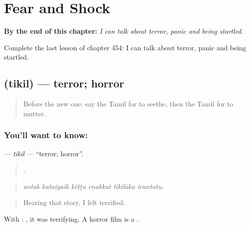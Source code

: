 
\chapter{Fear and Shock}
\label{ch:ta-fear-and-shock}

\begin{chapteropening}
\textbf{By the end of this chapter:} \emph{I can talk about terror, panic and being startled.}

Complete the last lesson of chapter 454: I can talk about terror, panic and being startled.
\end{chapteropening}

\section[\texorpdfstring{\ta{திகில்} (tikil)}{திகில் (tikil)}]{ (tikil) — terror; horror}

\label{lesson:TA-C454-tikil}



\begin{quote}
Before the new one: say the Tamil for to seethe, then the Tamil for to mutter.
\end{quote}

\subsection*{You'll want to know: }
\textbf{} — \emph{tikil} — \textquotedblleft{}terror; horror\textquotedblright{}.

\begin{quote}
     .
\end{quote}

\begin{quote}
\emph{antak kataiyaik kēṭṭu eṉakkut tikilāka iruntatu.}
\end{quote}

\begin{quote}
Hearing that story, I felt terrified.
\end{quote}

With :  , it was terrifying. A horror film is a  .

